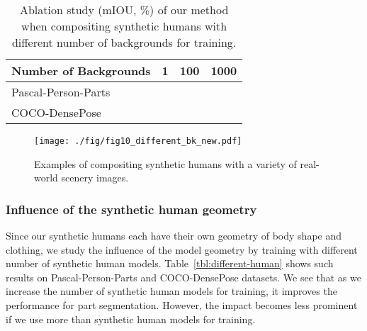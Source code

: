 \documentclass[final]{IEEEtran}
\begin{document}
{\begin{minipage}{\textwidth}
\begin{table}
	\centering
	\caption{Ablation study (mIOU, \%) of our method using different number of synthetic human models for training.}
\label{tbl:different-human}
\end{table}


\begin{table}
	\centering
	\caption{Ablation study (mIOU, \%) of our method when compositing synthetic humans with different number of backgrounds for training.}
\label{tbl:different-back}
    \begin{tabular}{lccc}
	\toprule
	 Number of Backgrounds & 1 & 100 & 1000\\
	 \midrule
	 Pascal-Person-Parts &  &   & \\
	 COCO-DensePose &  &   &  \\
	\bottomrule
	\end{tabular}
\end{table}
\begin{figure}[t]
 \centering
 \texttt{[image: ./fig/fig10\_different\_bk\_new.pdf]}
 \caption{Examples of compositing synthetic humans with a variety of real-world scenery images.}
\label{fig:real-bk} 
\end{figure}  
 
\subsubsection{\textbf{Influence of the synthetic human geometry}}
Since our synthetic humans each have their own geometry of body shape and clothing, we study the influence of the model geometry by training with different number of synthetic human models.
Table~\ref{tbl:different-human} shows such results on Pascal-Person-Parts and COCO-DensePose datasets. We see that as we increase the number of synthetic human models for training, it improves the performance for part segmentation. However, the impact becomes less prominent if we use more than  synthetic human models for training.


\end{minipage}}
\end{document}
